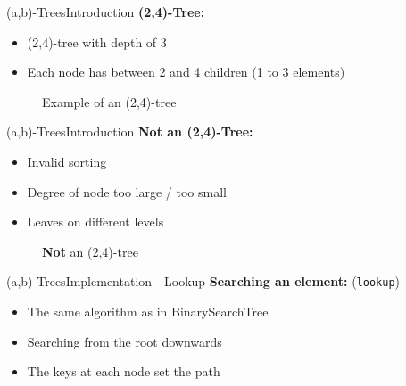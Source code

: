 
\begin{frame}{(a,b)-Trees}{Introduction}
  \textbf{(2,4)-Tree:}
  \begin{itemize}
    \item
      (2,4)-tree with depth of 3
    \item
      Each node has between 2 and 4 children (1 to 3 elements)
  \end{itemize}
  \begin{figure}
    \begin{adjustbox}{width=0.75\linewidth}
      
    \end{adjustbox}
    \caption{Example of an (2,4)-tree}
    \label{fig:a_b_tree:tree_introduction}
  \end{figure}
\end{frame}


\begin{frame}{(a,b)-Trees}{Introduction}
  \textbf{Not an (2,4)-Tree:}
  \begin{itemize}
    \item
      Invalid sorting
    \item
      Degree of node too large / too small
    \item
      Leaves on different levels
  \end{itemize}
  \begin{figure}
    \begin{adjustbox}{width=0.5\linewidth}
      
    \end{adjustbox}
    \caption{\textbf{Not} an (2,4)-tree}
    \label{fig:a_b_tree:tree_invalid_introduction}
  \end{figure}
\end{frame}


\begin{frame}{(a,b)-Trees}{Implementation - Lookup}
  \textbf{Searching an element:} (\texttt{\color{Mittel-Blau}lookup})
  \begin{itemize}
    \item
      The same algorithm as in {\color{Mittel-Blau}BinarySearchTree}
    \item
      Searching from the root downwards
    \item
      The keys at each node set the path
  \end{itemize}
\end{frame}

